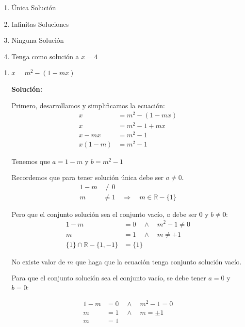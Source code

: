\documentclass[12pt]{article}
\newcommand{\solucion}{%
    \vspace{0.8em}%
    \textbf{Solución:}%
}
\begin{document}
\begin{enumerate}[label=\alph*.-]
    \item Única Solución
    \item Infinitas Soluciones
    \item Ninguna Solución
    \item Tenga como solución a $x = 4$
\end{enumerate}

\begin{enumerate}[label=\roman*)]
    \item $x = m^2 - (1 - mx)$

    \solucion

    Primero, desarrollamos y simplificamos la ecuación:
    \begin{align*}
    x &= m^2 - (1 - mx) \\[0.3em]
    x &= m^2 - 1 + mx \\[0.3em]
    x - mx &= m^2 - 1 \\[0.3em]
    x(1 - m) &= m^2 - 1
    \end{align*}

    Tenemos que $a = 1 - m$ y $b = m^2 - 1$

    Recordemos que para tener solución única debe ser $a \neq 0$.
    \begin{align*}
    1 - m &\neq 0 \\
    m &\neq 1 \quad \Rightarrow \quad m \in \mathbb{R} - \{1\}
    \end{align*}

    Pero que el conjunto solución sea el conjunto vacío, $a$ debe ser $0$ y $b \neq 0$:
    \begin{align*}
    1 - m &= 0 \quad \land \quad m^2 - 1 \neq 0 \\
    m &= 1 \quad \land \quad m \neq \pm 1 \\
    \{1\} \cap \mathbb{R} - \{1, -1\} &= \{1\}
    \end{align*}

    No existe valor de $m$ que haga que la ecuación tenga conjunto solución vacío.

    Para que el conjunto solución sea el conjunto vacío, se debe tener $a = 0$ y $b = 0$:

    \begin{align*}
    1 - m &= 0 \quad \land \quad m^2 - 1 = 0 \\
    m &= 1 \quad \land \quad m = \pm 1 \\
    m &= 1
    \end{align*}


\end{enumerate}
\end{document}
